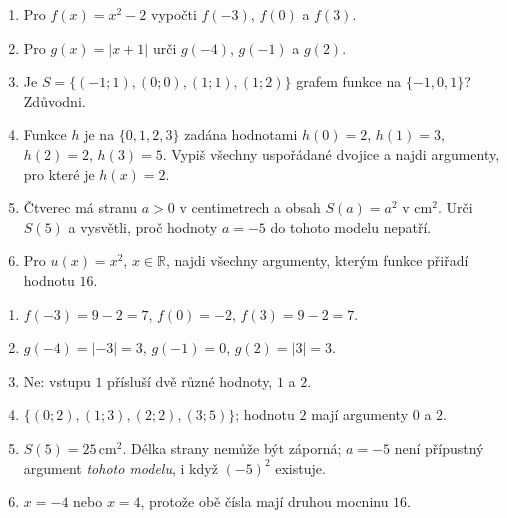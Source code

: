 \documentclass[11pt,a4paper]{article}
\begin{document}
\begin{zadaniReseniBox}[title={Domácí úkol}]
\begin{enumerate}[label=\alph*)]
\item Pro $f(x)=x^2-2$ vypočti $f(-3)$, $f(0)$ a $f(3)$.
\item Pro $g(x)=|x+1|$ urči $g(-4)$, $g(-1)$ a $g(2)$.
\item Je $S=\{(-1;1),(0;0),(1;1),(1;2)\}$ grafem funkce na
$\{-1,0,1\}$? Zdůvodni.
\item Funkce $h$ je na $\{0,1,2,3\}$ zadána hodnotami
$h(0)=2$, $h(1)=3$, $h(2)=2$, $h(3)=5$.
Vypiš všechny uspořádané dvojice a najdi argumenty, pro které je $h(x)=2$.
\item Čtverec má stranu $a>0$ v centimetrech a obsah $S(a)=a^2$
v $\mathrm{cm}^2$. Urči $S(5)$ a vysvětli, proč hodnoty $a=-5$ do tohoto modelu nepatří.
\item Pro $u(x)=x^2$, $x\in\mathbb R$, najdi všechny argumenty, kterým
funkce přiřadí hodnotu $16$.
\end{enumerate}
\tcblower
\begin{enumerate}[label=\alph*)]
\item $f(-3)=9-2=7$, $f(0)=-2$, $f(3)=9-2=7$.
\item $g(-4)=|-3|=3$, $g(-1)=0$, $g(2)=|3|=3$.
\item Ne: vstupu $1$ přísluší dvě různé hodnoty, $1$ a $2$.
\item $\{(0;2),(1;3),(2;2),(3;5)\}$; hodnotu $2$ mají argumenty $0$ a $2$.
\item $S(5)=25\,\mathrm{cm}^2$. Délka strany nemůže být záporná;
$a=-5$ není přípustný argument \emph{tohoto modelu}, i když $(-5)^2$ existuje.
\item $x=-4$ nebo $x=4$, protože obě čísla mají druhou mocninu $16$.
\end{enumerate}
\end{zadaniReseniBox}

\end{document}
